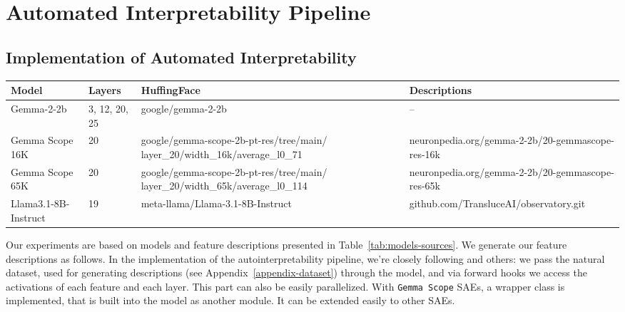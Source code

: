 \section{Automated Interpretability Pipeline}

\subsection{Implementation of Automated Interpretability}
\label{appendix-autointerpretability-pipeline}

\begin{table*}[t]
\scriptsize
\centering
\begin{tabular}{p{2.2cm}p{1.2cm}p{4.6cm}p{6cm}} 
Model                 &   Layers       &       HuffingFace             & Descriptions   \\ \hline \hline 
Gemma-2-2b            & 3, 12, 20, 25 &   google/gemma-2-2b  &  --     \\
Gemma Scope 16K       &    20         & google/gemma-scope-2b-pt-res/tree/main/ layer\_20/width\_16k/average\_l0\_71  & neuronpedia.org/gemma-2-2b/20-gemmascope-res-16k    \\
Gemma Scope 65K       &    20         & google/gemma-scope-2b-pt-res/tree/main/ layer\_20/width\_65k/average\_l0\_114  & neuronpedia.org/gemma-2-2b/20-gemmascope-res-65k    \\
Llama3.1-8B-Instruct  & 19   & meta-llama/Llama-3.1-8B-Instruct &  github.com/TransluceAI/observatory.git \\ \hline 
\end{tabular}
\caption{Sources for models, SAEs and feature descriptions, used in this work. }
\label{tab:models-sources}
\end{table*}

Our experiments are based on models and feature descriptions presented in Table~\ref{tab:models-sources}. We generate our feature descriptions as follows. 
%
In the implementation of the autointerpretability pipeline, we're closely following \cite{bills2023language, paulo2024automaticallyinterpretingmillionsfeatures, rajamanoharan2024jumpingaheadimprovingreconstruction} and others: we pass the natural dataset, used for generating descriptions (see Appendix~\ref{appendix-dataset}) through the model, and via forward hooks we access the activations of each feature and each layer. This part can also be easily parallelized. With \texttt{Gemma Scope} SAEs, a wrapper class is implemented, that is built into the model as another module. It can be extended easily to other SAEs. 

